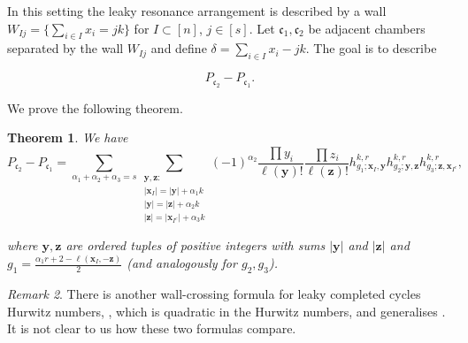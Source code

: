 \documentclass[10pt,a4paper,oneside,no-math,reqno]{amsart}%
\theoremstyle{plain}
\newtheorem{theorem}{Theorem}[section]
\theoremstyle{definition}
\theoremstyle{remark}
\newtheorem{remark}[theorem]{Remark}
\numberwithin{equation}{section}
\newcommand{\1}{\mathds{1}}
\newcommand{\<}{\langle}
\renewcommand{\>}{\rangle}
\begin{document}
In this setting the leaky resonance arrangement is described by a wall $W_{Ij}=\{\sum_{i\in I}x_i=jk\}$ for $I\subset [n]$, $j\in[s]$. Let $\mathfrak{c}_1,\mathfrak{c}_2$ be adjacent chambers separated by the wall $W_{Ij}$ and define $\delta=\sum_{i\in I}x_i-jk$. The goal is to describe

\begin{equation}
    P_{\mathfrak{c}_2}-P_{\mathfrak{c}_1}.
\end{equation}

We prove the following theorem.

\begin{theorem}
    \label{thm-WC}
    We have
    \begin{equation}
        P_{\mathfrak{c}_2}-P_{\mathfrak{c}_1}
        =
        \sum_{\alpha_1+\alpha_2+\alpha_3=s}
        \sum_{\substack{\mathbf{y},\mathbf{z}\colon\\ |\mathbf{x}_I|=|\mathbf{y}|+\alpha_1k
        \\
        |\mathbf{y}|=|\mathbf{z}|+\alpha_2 k
        \\
        |\mathbf{z}|=|\mathbf{x}_{I^{c}}|+\alpha_3k}}(-1)^{\alpha_2}\frac{\prod y_i}{\ell(\mathbf{y})!}\frac{\prod z_i}{\ell(\mathbf{z})!}h^{k,r}_{g_1;\mathbf{x}_I,\mathbf{y}} h^{k,r}_{g_2;\mathbf{y},\mathbf{z}} h^{k,r}_{g_3;\mathbf{z},\mathbf{x}_{I^c}},
    \end{equation}

    where $\mathbf{y},\mathbf{z}$ are ordered tuples of positive integers with sums $|\mathbf{y}|$ and $|\mathbf{z}|$ and $g_1=\frac{\alpha_1 r+2-\ell(\mathbf{x}_I,-\mathbf{z})}{2}$ (and analogously for $g_2,g_3$).
\end{theorem}

\begin{remark}
    There is another wall-crossing formula for leaky completed cycles Hurwitz numbers, \cite[Theorem 6.1]{AKL25}, which is quadratic in the Hurwitz numbers, and generalises \cite[Theorem 1.5]{Joh15}. It is not clear to us how these two formulas compare.
\end{remark}
\end{document}
